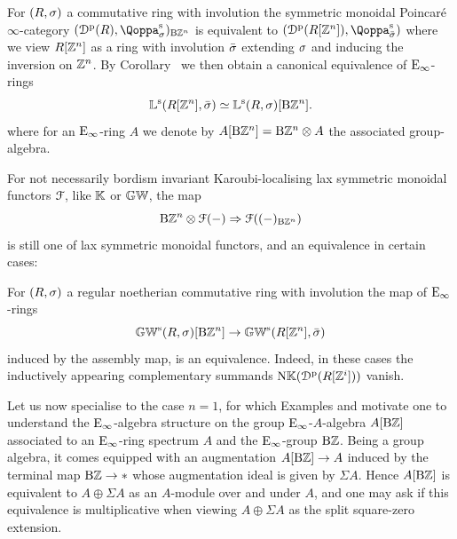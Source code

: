 \begin{example}
\label{example:group-rings}%
For $(R,\sigma)$ a commutative ring with involution the symmetric monoidal Poincaré $\infty$-category $(\Dperf(R),\QF^{\sym}_{\sig})_{\B\ZZ^n}$ is equivalent to $(\Dperf(R[\ZZ^n]),\QF^{\sym}_{\bar{\sig}})$ where we view $R[\mathbb{Z}^n]$ as a ring with involution $\bar{\sigma}$ extending $\sigma$ and inducing the inversion on $\mathbb{Z}^n$. By Corollary~ we then obtain 
a canonical equivalence of ${\mathrm{E}_{\infty}}$-rings
\[
\mathbb{L}^{\mathrm{s}}(R[\mathbb{Z}^n],\bar{\sigma}) \simeq  \mathbb{L}^{\mathrm{s}}(R,\sigma)[\mathrm{B}\mathbb{Z}^n].
\]
where for an ${\mathrm{E}_{\infty}}$-ring $A$ we denote by
$A[\mathrm{B}\mathbb{Z}^n]=\mathrm{B}\mathbb{Z}^n \otimes A$ the associated group-algebra.
\end{example}

For not necessarily bordism invariant Karoubi-localising lax symmetric monoidal functors $\mathcal{F}$, like $\mathbb K$ or $\mathbb{GW}$, the map 
\[
\mathrm{B}\mathbb{Z}^n \otimes \mathcal{F}(-) \Rightarrow \mathcal{F}((-)_{\mathrm{B}\mathbb{Z}^n})
\]
is still one of lax symmetric monoidal functors, and an equivalence in certain cases:

\begin{example}
\label{example:regular-noetherian}%
For $(R,\sigma)$ a regular noetherian commutative ring with involution 
the map of ${\mathrm{E}_{\infty}}$-rings
\[
\mathbb{GW}^{\mathrm{s}}(R,\sigma)[\mathrm{B}\mathbb{Z}^n] \to \mathbb{GW}^{\mathrm{s}}(R[\mathbb{Z}^n],\bar{\sigma})
\]
induced by the assembly map, is an equivalence. Indeed, in these cases the inductively appearing complementary summands $\mathrm{N}\mathbb K({\mathcal D}^{\mathrm{p}}(R[\mathbb{Z}^i]))$ vanish. 
\end{example}











Let us now specialise to the case $n=1$, for which Examples  and  motivate one to understand the ${\mathrm{E}_{\infty}}$-algebra structure on 
the group ${\mathrm{E}_{\infty}}$-$A$-algebra $A[\mathrm{B}\mathbb{Z}]$ associated to an ${\mathrm{E}_{\infty}}$-ring spectrum $A$ and the ${\mathrm{E}_{\infty}}$-group $\mathrm{B}\mathbb{Z}$. Being a group algebra, it comes equipped with an augmentation $A[\mathrm{B}\mathbb{Z}] \to A$ induced by the terminal map $\mathrm{B}\mathbb{Z} \to \ast$ whose augmentation ideal is given by $\Sigma A$. Hence $A[\mathrm{B}\mathbb{Z}]$ is equivalent to $A\oplus\Sigma A$ as an $A$-module over and under $A$, and one may ask if this equivalence is multiplicative when viewing $A \oplus \Sigma A$ as
the split square-zero extension.


